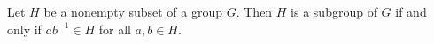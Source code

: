 Let $H$ be a nonempty subset of a group $G$. Then $H$ is a subgroup of $G$ if and only if $ab^{-1} \in H$ for all $a,b \in H$.
